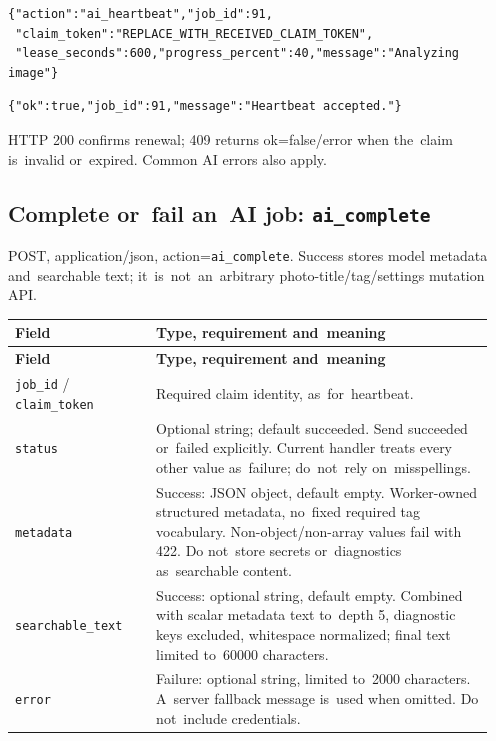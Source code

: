 \documentclass[11pt,a4paper]{article}
\newcommand{\codeword}[1]{\nolinkurl{#1}}
\begin{document}
\begin{lstlisting}[language={}]
{"action":"ai_heartbeat","job_id":91,
 "claim_token":"REPLACE_WITH_RECEIVED_CLAIM_TOKEN",
 "lease_seconds":600,"progress_percent":40,"message":"Analyzing image"}
\end{lstlisting}

\begin{lstlisting}[language={}]
{"ok":true,"job_id":91,"message":"Heartbeat accepted."}
\end{lstlisting}

HTTP 200 confirms renewal; 409 returns ok=false/error when the~claim is~invalid or~expired.
Common AI errors also apply.

\subsection{\texorpdfstring{Complete or~fail an~AI job: \codeword{ai_complete}}{Complete or fail an AI job: ai\_complete}}

\label{api352:ai-complete}

POST, application/json, action=\codeword{ai_complete}. Success stores model metadata
and~searchable text; it~is~not~an~arbitrary photo-title/tag/settings mutation API.

\begin{longtable}{@{}>{\RaggedRight\arraybackslash}p{0.28\linewidth}>{\RaggedRight\arraybackslash}p{0.67\linewidth}@{}}
\toprule
\textbf{Field} & \textbf{Type, requirement and~meaning} \\
\midrule
\endfirsthead
\toprule
\textbf{Field} & \textbf{Type, requirement and~meaning} \\
\midrule
\endhead
\bottomrule
\endfoot
\codeword{job_id} / \codeword{claim_token} & Required claim identity, as~for~heartbeat. \\
\codeword{status} & Optional string; default succeeded. Send succeeded or~failed explicitly.
Current handler treats every other value as~failure; do~not~rely on~misspellings. \\
\codeword{metadata} & Success: JSON object, default empty. Worker-owned structured metadata,
no~fixed required tag vocabulary. Non-object/non-array values fail with 422. Do not~store
secrets or~diagnostics as~searchable content. \\
\codeword{searchable_text} & Success: optional string, default empty. Combined with scalar
metadata text to~depth 5, diagnostic keys excluded, whitespace normalized; final text
limited to~60000 characters. \\
\codeword{error} & Failure: optional string, limited to~2000 characters. A~server fallback
message is~used when omitted. Do not~include credentials. \\
\end{longtable}
\end{document}
